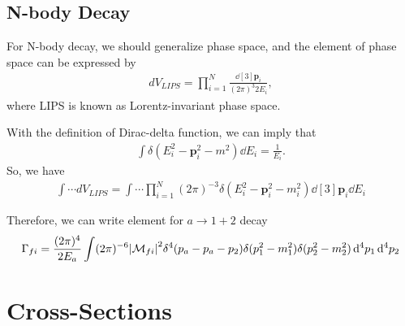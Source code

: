 \subsection{N-body Decay}

For N-body decay, we should generalize phase space, and the element of phase space can be expressed by 
\begin{align}
    dV_{LIPS}=\prod^{N}_{i=1} \frac{\dd[3]{\mathbf{p}_{i}}}{(2\pi)^{3}2 E_{i}},
\end{align}
where LIPS is known as Lorentz-invariant phase space.

With the definition of Dirac-delta function, we can imply that
\begin{align}
    \int \delta(E^{2}_{i}-\mathbf{p}^{2}_{i}-m^{2})\dd E_{i}=\frac{1}{E_{i}}.
\end{align}
So, we have
\begin{align}
    \int \cdots dV_{LIPS}=\int \cdots \prod_{i=1}^{N}(2\pi)^{-3}\delta(E^{2}_{i}-\mathbf{p}^{2}_i-m^{2}_i)\dd[3]{\mathbf{p}_{i}}\dd E_{i}
\end{align}

Therefore, we can write element for $a\rightarrow 1+2$ decay 
\begin{align}
    \Gamma_{fi}=\frac{(2\pi)^{4}}{2E_{a}}\int (2\pi)^{-6}\abs{\mathcal{M}_{fi}}^{2}\delta^{4}(p_{a} -p_{a}-p_{2})\delta(p^{2}_{1}-m^{2}_{1})\delta(p^{2}_{2}-m^{2}_{2})\dd[4]{p_{1}}\dd[4]{p_{2}}
\end{align}




\section{Cross-Sections}